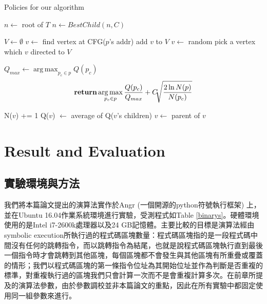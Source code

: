 \documentclass[12pt,a4paper,oneside]{book}
\DeclareMathOperator*{\argmax}{arg\,max}
\begin{document}
\begin{algorithm}[H]
  \caption{Policies for our algorithm}
  \begin{algorithmic}[]
    	\State $n \leftarrow$ root of $T$
            	\State {}
            \Else
            	\State $n \leftarrow BestChild(n,C)$
            \EndIf
        \EndWhile
    \EndFunction
    \item[]
    	\State $V \leftarrow \emptyset$
          \State $v \leftarrow$ find vertex at CFG($p$'s addr)
              \State add $v$ to $V$
              \State $v \leftarrow$ random pick a vertex which $v$ directed to
          \EndFor
        \EndFor
        \State \Return $V$
    \EndFunction
    \item[]
    	\State $Q_{max} \leftarrow \operatorname*{arg\,max}_{p_c \in p} Q(p_c)$
    	\State \[ \Return \argmax_{p_c \in p} \frac{Q(p_c)}{Q_{max}}+C\sqrt[]{\frac{2\ln N(p)}{N(p_c)}} \]
    \EndFunction
    \item[]
    	\State N($v$) += 1
		\State Q($v$) $\leftarrow$ average of Q($v$'s children)
    \State $v \leftarrow$ parent of $v$
    \EndWhile
    \EndFunction
  \end{algorithmic}
\end{algorithm}

\chapter{Result and Evaluation}

\section{實驗環境與方法}

我們將本篇論文提出的演算法實作於Angr (一個開源的python符號執行框架) \cite{angr}上，並在Ubuntu 16.04作業系統環境進行實驗，受測程式如Table \ref{binarys}。硬體環境使用的是Intel i7-2600k處理器以及24 GB記憶體。主要比較的目標是演算法經由symbolic execution所執行過的程式碼區塊數量：程式碼區塊指的是一段程式碼中間沒有任何的跳轉指令，而以跳轉指令為結尾，也就是說程式碼區塊執行直到最後一個指令時才會跳轉到其他區塊，每個區塊都不會發生與其他區塊有所重疊或覆蓋的情形；我們以程式碼區塊的第一條指令位址為其開始位址並作為判斷是否重複的標準，對重複執行過的區塊我們只會計算一次而不是會重複計算多次。在前章所提及的演算法參數，由於參數調校並非本篇論文的重點，因此在所有實驗中都固定使用同一組參數來進行。
\end{document}
